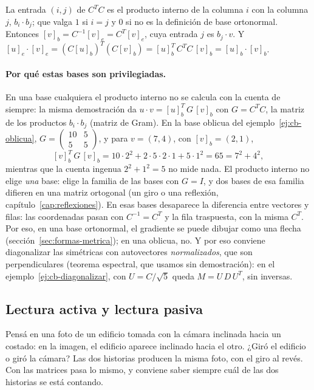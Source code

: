 \begin{demostracion}
La entrada \((i,j)\) de \(C^TC\) es el producto interno de la columna \(i\) con la columna
\(j\), \(b_i\cdot b_j\); que valga \(1\) si \(i=j\) y \(0\) si no es la definición de base
ortonormal. Entonces \([v]_b=C^{-1}[v]_e=C^T[v]_e\), cuya entrada \(j\) es \(b_j\cdot v\). Y
\([u]_e\cdot[v]_e=(C[u]_b)^T(C[v]_b)=[u]_b^T\,C^TC\,[v]_b=[u]_b\cdot[v]_b\).
\end{demostracion}

\paragraph{Por qué estas bases son privilegiadas.} En una base cualquiera el producto interno
no se calcula con la cuenta de siempre: la misma demostración da
\(u\cdot v=[u]_b^T\,G\,[v]_b\) con \(G=C^TC\), la matriz de los productos \(b_i\cdot b_j\)
(matriz de Gram). En la base oblicua del ejemplo~\ref{ej:cb-oblicua},
\(G=\left(\begin{smallmatrix}10&5\\5&5\end{smallmatrix}\right)\), y para \(v=(7,4)\), con
\([v]_b=(2,1)\),
\[
  [v]_b^T\,G\,[v]_b=10\cdot2^2+2\cdot5\cdot2\cdot1+5\cdot1^2=65=7^2+4^2 ,
\]
mientras que la cuenta ingenua \(2^2+1^2=5\) no mide nada. El producto interno no elige
\emph{una} base: elige la familia de las bases con \(G=I\), y dos bases de esa familia difieren
en una matriz ortogonal (un giro o una reflexión, capítulo~\ref{cap:reflexiones}). En esas
bases desaparece la diferencia entre vectores y filas: las coordenadas pasan con
\(C^{-1}=C^T\) y la fila traspuesta, con la misma \(C^T\). Por eso, en una base ortonormal, el
gradiente se puede dibujar como una flecha (sección~\ref{sec:formas-metrica}); en una oblicua,
no. Y por eso conviene diagonalizar las simétricas con autovectores \emph{normalizados}, que son
perpendiculares (teorema espectral, que usamos sin demostración): en el
ejemplo~\ref{ej:cb-diagonalizar}, con \(U=C/\sqrt5\) queda \(M=U\,D\,U^T\), sin inversas.

\subsection{Lectura activa y lectura pasiva}\label{sec:activa-pasiva-cb}

Pensá en una foto de un edificio tomada con la cámara inclinada hacia un costado: en la imagen,
el edificio aparece inclinado hacia el otro. ¿Giró el edificio o giró la cámara? Las dos
historias producen la misma foto, con el giro al revés. Con las matrices pasa lo mismo, y
conviene saber siempre cuál de las dos historias se está contando.

